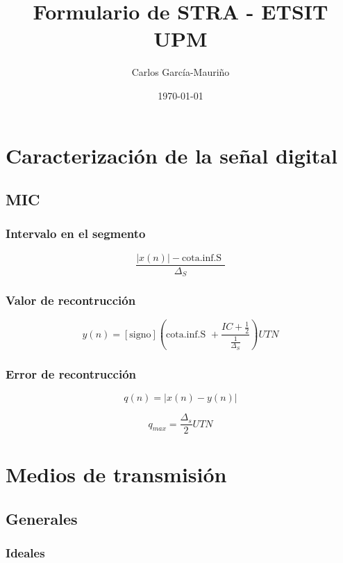 \documentclass[12pt,a4paper]{article}
\title{Formulario de STRA - ETSIT UPM}
\author{Carlos García-Mauriño}
\date{\today}
\begin{document}
\maketitle

\twocolumn

\section{Caracterización de la señal digital}
\label{sec:caracterizacion_de_la_senal_digital}

\subsection{MIC}
\label{sub:mic}

\subsubsection{Intervalo en el segmento}
\label{ssub:intervalo_en_el_segmento}

\[ \frac{|x(n)| - \mbox{cota.inf.S }}{\Delta_S} \]

\subsubsection{Valor de recontrucción}
\label{ssub:valor_de_recontruccion}

\[ y(n) = [\mbox{signo}] \left( \mbox{cota.inf.S }
			+\frac{IC+\frac{1}{2}}{\frac{1}{\Delta_S}} \right) UTN \]

\subsubsection{Error de recontrucción}
\label{ssub:error_de_recontruccion}

\[ q(n) = | x(n) - y (n) | \]

\[ q_{max} = \frac{\Delta_s}{2} UTN \]

\section{Medios de transmisión}
\label{medios_de_transmision}

\subsection{Generales}
\label{sub:generales}


\subsubsection{Ideales}
\label{ssub:ideales}
\end{document}

